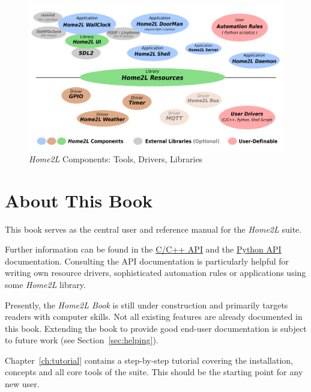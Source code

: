\documentclass[12pt,english,parskip=half]{scrreprt}
\newcommand{\figfile}[2]{#2}             %
\newcommand{\figfile}[2]{\href{#1}{#2}}  %
\newcommand{\projecturl}{}
\newcommand{\docref}[2]{\href{\projecturl#1}{#2}}
\newcommand{\refapipython}{\docref{home2l-api_python/index.html}{Python API}}
\newcommand{\refapic}{\docref{home2l-api_c/index.html}{C/C++ API}}
\begin{document}
\begin{figure}[ht]
  \centering
  \figfile{figs/home2l-components.svg}{
    \includegraphics[width=0.9\linewidth,keepaspectratio]{figs/home2l-components}   %
  }
  \caption[l]{\emph{Home2L} Components:
    \textcolor[rgb]{0.2,0.3,1.0}{Tools},
    \textcolor[rgb]{0.5,0.25,0}{Drivers},
    \textcolor[rgb]{0,0.5,0}{Libraries}
  }
  \label{fig:home2l-components}
\end{figure}




\section{About This Book}
\label{sec:intro-about}

This book serves as the central user and reference manual for the \emph{Home2L} suite.

Further information can be found in the \refapic{} and the \refapipython{} documentation.
Consulting the API documentation is particularly helpful for writing own resource drivers,
sophisticated automation rules or applications using some \emph{Home2L} library.

Presently, the \textit{Home2L Book} is still under construction and primarily targets readers with computer skills. Not all existing features are already documented in this book.
Extending the book to provide good end-user documentation is subject to future work 
(see Section~\ref{sec:helping}).

Chapter~\ref{ch:tutorial} contains a step-by-step tutorial covering the installation, 
concepts and all core tools of the suite. This should be the starting point for any new user.
\end{document}
